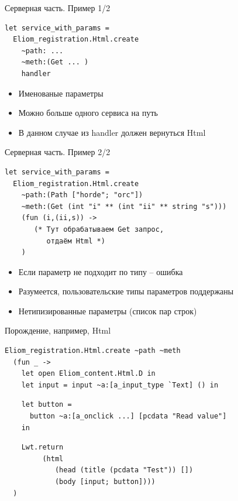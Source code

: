 \documentclass{beamer}
\theoremstyle{definition}
\begin{document}
\begin{frame}[fragile]{Серверная часть. Пример 1/2}
\begin{verbatim}
let service_with_params =
  Eliom_registration.Html.create
    ~path: ...
    ~meth:(Get ... )
    handler
\end{verbatim}
\pause{}
\hypersetup{colorlinks,linkcolor=,urlcolor=links}
\begin{itemize}
 \item Именованые параметры
 \item Можно больше одного сервиса на путь
 \item В данном случае из handler должен вернуться Html
\end{itemize}
\end{frame}

\begin{frame}[fragile]{Серверная часть. Пример 2/2}
\begin{verbatim}
let service_with_params =
  Eliom_registration.Html.create
    ~path:(Path ["horde"; "orc"])
    ~meth:(Get (int "i" ** (int "ii" ** string "s")))
    (fun (i,(ii,s)) -> 
       (* Тут обрабатываем Get запрос, 
          отдаём Html *)
    )
\end{verbatim}
\pause
\begin{itemize}
 \item Если параметр не подходит по типу -- ошибка
 \item Разумеется, пользовательские типы параметров поддержаны
 \item Нетипизированные параметры (список пар строк)
\end{itemize}

\end{frame}

\begin{frame}[fragile]{Порождение, например, Html}
\begin{verbatim}
Eliom_registration.Html.create ~path ~meth
  (fun _ ->
    let open Eliom_content.Html.D in
    let input = input ~a:[a_input_type `Text] () in
\end{verbatim}
\pause\vspace{-2pt}
\begin{verbatim}
    let button =
      button ~a:[a_onclick ...] [pcdata "Read value"]
    in
\end{verbatim}
\pause\vspace{-2pt}
\begin{verbatim}
    Lwt.return
         (html
            (head (title (pcdata "Test")) [])
            (body [input; button])))
  )
\end{verbatim}
\end{frame}
\end{document}
